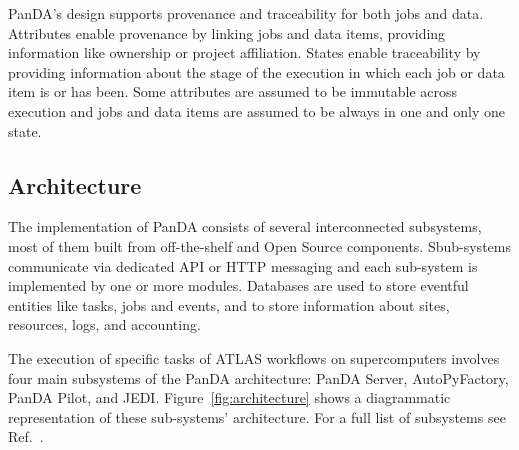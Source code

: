 PanDA's design supports provenance and traceability for both jobs and data.
Attributes enable provenance by linking jobs and data items, providing
information like ownership or project affiliation. States enable traceability by
providing information about the stage of the execution in which each job or data
item is or has been. Some attributes are assumed to be immutable across
execution and jobs and data items are assumed to be always in one and only one
state.


\subsection{Architecture}
\label{ssec:panda_arch}

The implementation of PanDA consists of several interconnected subsystems, most
of them built from off-the-shelf and Open Source components. Sbub-systems
communicate via dedicated API or HTTP messaging and each sub-system is
implemented by one or more modules. Databases are used to store eventful
entities like tasks, jobs and events, and to store information about sites,
resources, logs, and accounting.

The execution of specific tasks of ATLAS workflows on supercomputers involves
four main subsystems of the PanDA architecture: PanDA Server, AutoPyFactory,
PanDA Pilot, and JEDI. Figure~\ref{fig:architecture} shows a diagrammatic
representation of these sub-systems' architecture. For a full list of subsystems
see Ref.~\cite{panda-wiki_url}.



